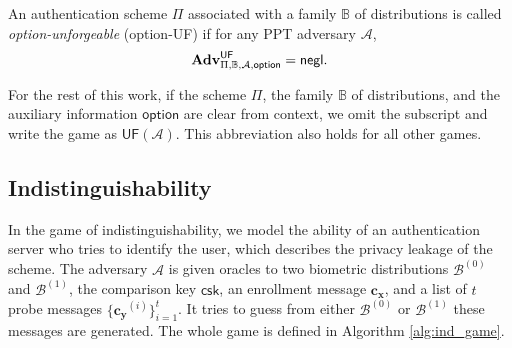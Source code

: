 An authentication scheme $\Pi$ associated with a family $\mathbb{B}$ of distributions is called \emph{\textsf{option}-unforgeable} (\textsf{option}-UF) if for any PPT adversary $\mathcal{A}$,
\[
	\mathbf{Adv}^{\textsf{UF}}_{\Pi, \mathbb{B}, \mathcal{A}, \textsf{option}} = \mathsf{negl}.
\]

For the rest of this work, if the scheme $\Pi$, the family $\mathbb{B}$ of distributions, and the auxiliary information $\textsf{option}$ are clear from context, we omit the subscript and write the game as $\textsf{UF}(\mathcal{A})$. This abbreviation also holds for all other games.




\subsection{Indistinguishability}
\label{sec:ind_game}


In the game of indistinguishability, we model the ability of an authentication server who tries to identify the user, which describes the privacy leakage of the scheme. The adversary $\mathcal{A}$ is given oracles to two biometric distributions $\mathcal{B}^{(0)}$ and $ \mathcal{B}^{(1)}$, the comparison key $\textsf{csk}$, an enrollment message $\mathbf{c_x}$, and a list of $t$ probe messages $\{ \mathbf{c_y}^{(i)} \}_{i=1}^t$. It tries to guess from either $\mathcal{B}^{(0)}$ or $ \mathcal{B}^{(1)}$ these messages are generated. The whole game is defined in Algorithm \ref{alg:ind_game}.


